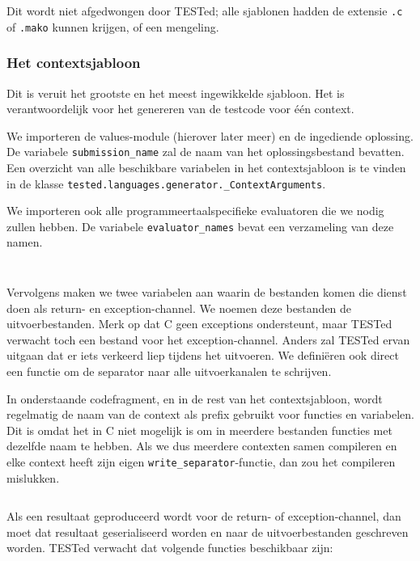 Dit wordt niet afgedwongen door TESTed;
alle sjablonen hadden de extensie \texttt{.c} of \texttt{.mako} kunnen krijgen, of een mengeling.

\subsubsection{Het contextsjabloon}

Dit is veruit het grootste en het meest ingewikkelde sjabloon.
Het is verantwoordelijk voor het genereren van de testcode voor één context.

We importeren de values-module (hierover later meer) en de ingediende oplossing.
De variabele \texttt{submission\_name} zal de naam van het oplossingsbestand bevatten.
Een overzicht van alle beschikbare variabelen in het contextsjabloon is te vinden in de klasse \texttt{tested.languages.generator.\_ContextArguments}.

We importeren ook alle programmeertaalspecifieke evaluatoren die we nodig zullen hebben.
De variabele \texttt{evaluator\_names} bevat een verzameling van deze namen.

\inputminted[firstline=3,lastline=7]{mako}{sources/c-context.mako}
\vspace{-1.7cm} %
\inputminted[firstline=9,lastline=11]{mako}{sources/c-context.mako}

Vervolgens maken we twee variabelen aan waarin de bestanden komen die dienst doen als return- en exception-channel.
We noemen deze bestanden de uitvoerbestanden.
Merk op dat C geen exceptions ondersteunt, maar TESTed verwacht toch een bestand voor het exception-channel.
Anders zal TESTed ervan uitgaan dat er iets verkeerd liep tijdens het uitvoeren.
We definiëren ook direct een functie om de separator naar alle uitvoerkanalen te schrijven.

In onderstaande codefragment, en in de rest van het contextsjabloon, wordt regelmatig de naam van de context als prefix gebruikt voor functies en variabelen.
Dit is omdat het in C niet mogelijk is om in meerdere bestanden functies met dezelfde naam te hebben.
Als we dus meerdere contexten samen compileren en elke context heeft zijn eigen \texttt{write\_separator}-functie, dan zou het compileren mislukken.

\inputminted[firstline=13,lastline=21]{mako}{sources/c-context.mako}

Als een resultaat geproduceerd wordt voor de return- of exception-channel, dan moet dat resultaat geserialiseerd worden en naar de uitvoerbestanden geschreven worden.
TESTed verwacht dat volgende functies beschikbaar zijn:

